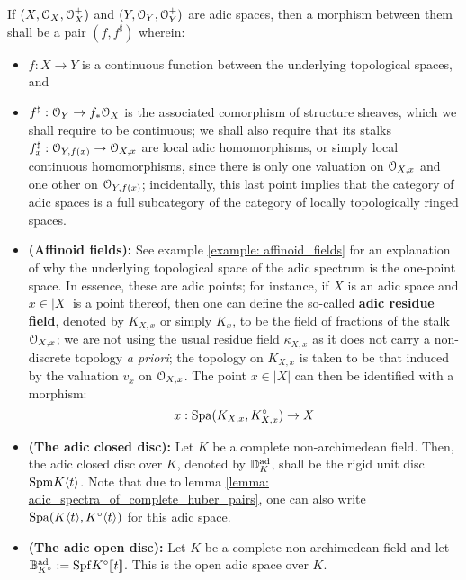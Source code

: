             \begin{definition}
                If $(X, \mathcal{O}_X, \mathcal{O}_X^+)$ and $(Y, \mathcal{O}_Y, \mathcal{O}_Y^+)$ are adic spaces, then a morphism between them shall be a pair $(f, f^{\sharp})$ wherein:
                    \begin{itemize}
                        \item $f: X \to Y$ is a continuous function between the underlying topological spaces, and
                        \item $f^{\sharp}: \mathcal{O}_Y \to f_*\mathcal{O}_X$ is the associated comorphism of structure sheaves, which we shall require to be continuous; we shall also require that its stalks $f^{\sharp}_x: \mathcal{O}_{Y, f(x)} \to \mathcal{O}_{X, x}$ are local adic homomorphisms, or simply local continuous homomorphisms, since there is only one valuation on $\mathcal{O}_{X, x}$ and one other on $\mathcal{O}_{Y, f(x)}$; incidentally, this last point implies that the category of adic spaces is a full subcategory of the category of locally topologically ringed spaces.
                    \end{itemize}
            \end{definition}
            \begin{example} \label{example: adic_spaces}
                \noindent
                \begin{itemize}
                    \item \textbf{(Affinoid fields):} See example \ref{example: affinoid_fields} for an explanation of why the underlying topological space of the adic spectrum is the one-point space. In essence, these are adic points; for instance, if $X$ is an adic space and $x \in |X|$ is a point thereof, then one can define the so-called \textbf{adic residue field}, denoted by $K_{X, x}$ or simply $K_x$, to be the field of fractions of the stalk $\mathcal{O}_{X, x}$; we are not using the usual residue field $\kappa_{X, x}$ as it does not carry a non-discrete topology \textit{a priori}; the topology on $K_{X, x}$ is taken to be that induced by the valuation $v_x$ on $\mathcal{O}_{X, x}$. The point $x \in |X|$ can then be identified with a morphism:
                        $$x: \mathrm{Spa}(K_{X, x}, K_{X, x}^{\circ}) \to X$$
                    \item \textbf{(The adic closed disc):} Let $K$ be a complete non-archimedean field. Then, the adic closed disc over $K$, denoted by $\mathbb{D}_K^{\mathrm{ad}}$, shall be the rigid unit disc $\mathrm{Spm} K\langle t\rangle$. Note that due to lemma \ref{lemma: adic_spectra_of_complete_huber_pairs}, one can also write $\mathrm{Spa}(K\langle t\rangle, K^{\circ}\langle t\rangle)$ for this adic space.
                    \item \textbf{(The adic open disc):} Let $K$ be a complete non-archimedean field and let $\mathbb{B}^{\mathrm{ad}}_{K^{\circ}} := \mathrm{Spf} K^{\circ}[\![t]\!]$. This is the open adic space over $K$.
                \end{itemize}
            \end{example}
            
